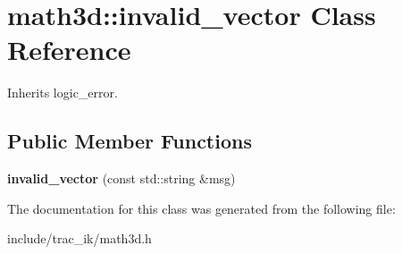 \section{math3d\-:\-:invalid\-\_\-vector Class Reference}
\label{classmath3d_1_1invalid__vector}


Inherits logic\-\_\-error.

\subsection*{Public Member Functions}
\begin{DoxyCompactItemize}
\item 
{\bfseries invalid\-\_\-vector} (const std\-::string \&msg)\label{classmath3d_1_1invalid__vector_aa3d7e208a0831f31fe34173a9200c51c}

\end{DoxyCompactItemize}


The documentation for this class was generated from the following file\-:\begin{DoxyCompactItemize}
\item 
include/trac\-\_\-ik/math3d.\-h\end{DoxyCompactItemize}
